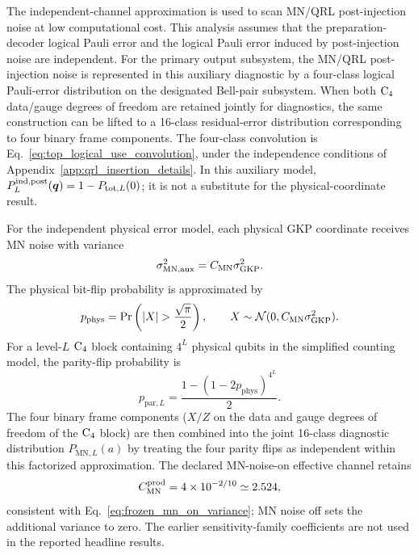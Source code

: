 \documentclass[aps,
prx,
superscriptaddress,
reprint,
longbibliography,
floatfix]{revtex4-2}
\newcommand{\GKP}{\mathrm{GKP}}
\newcommand{\MN}{\mathrm{MN}}
\newcommand{\act}{a}
\begin{document}
The independent-channel approximation is used to scan MN/QRL post-injection noise at low computational cost. 
This analysis assumes that the preparation-decoder logical Pauli error and the logical Pauli error induced by post-injection noise are independent. For the primary output subsystem, the MN/QRL post-injection noise is represented in this auxiliary diagnostic by a four-class logical Pauli-error distribution on the designated Bell-pair subsystem. When both ${\rm C_4}$ data/gauge degrees of freedom are retained jointly for diagnostics, the same construction can be lifted to a 16-class residual-error distribution corresponding to four binary frame components. The four-class convolution is Eq.~\eqref{eq:top_logical_use_convolution}, under the independence conditions of Appendix~\ref{app:qrl_insertion_details}. In this auxiliary model, $P_L^{\rm ind,post}(\bm q)=1-P_{\mathrm{tot},L}(0)$; it is not a substitute for the physical-coordinate result.

For the independent physical error model, each physical GKP coordinate receives MN noise with variance
\begin{equation}
 \sigma_{\MN,{\rm aux}}^2=C_{\MN}\sigma_{\GKP}^2.
\end{equation}
The physical bit-flip probability is approximated by
\begin{equation}
 p_{\mathrm{phys}}
 =
 \Pr\left(|X|>\frac{\sqrt{\pi}}{2}\right),
 \qquad
 X\sim{\cal N}(0,C_{\MN}\sigma_{\GKP}^2).
 \label{eq:app_physical_flip}
\end{equation}
For a level-\(L\) ${\rm C_4}$ block containing \(4^L\) physical qubits in the simplified counting model, the parity-flip probability is
\begin{equation}
 p_{\mathrm{par},L}
 =
 \frac{1-(1-2p_{\mathrm{phys}})^{4^L}}{2}.
 \label{eq:app_parity_flip}
\end{equation}
The four binary frame components ($X/Z$ on the data and gauge degrees of freedom of the ${\rm C_4}$ block) are then combined into the joint 16-class diagnostic distribution $P_{\MN,L}(\act)$ by treating the four parity flips as independent within this factorized approximation. The declared MN-noise-on effective channel retains
\begin{equation}
C_{\MN}^{\rm prod}=4\times10^{-2/10}\simeq2.524,
\end{equation}
consistent with Eq.~\eqref{eq:frozen_mn_on_variance}; MN noise off sets the additional variance to zero. The earlier sensitivity-family coefficients are not used in the reported headline results.
\end{document}
